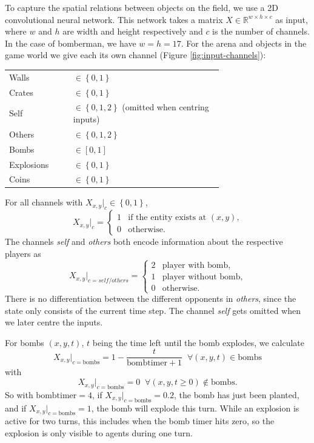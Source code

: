 

To capture the spatial relations between objects on the field, we use a 2D convolutional neural network. This network takes a matrix $X\in\mathbb{R}^{w\times h \times c} $ as input, where $w$ and $h$ are width and height respectively and $c$ is the number of channels. In the case of bomberman, we have $w=h=17$. For the arena and objects in the game world we give each its own channel (Figure \ref{fig:input-channels}):\vspace{8pt}

\begin{tabular}{l p{0.7\linewidth}}
Walls & $\in\left\{0,1\right\}$ \\
Crates & $\in\left\{0,1\right\}$ \\
Self & $\in\left\{0,1,2\right\}$ (omitted when centring inputs)\\
Others & $\in\left\{0,1,2\right\}$\\
Bombs & $\in\left[0, 1\right]$ \\
Explosions & $\in\left\{0,1\right\}$ \\
Coins& $\in\left\{0,1\right\}$ \\
\end{tabular}

\vspace{8pt}
For all channels with $X_{x, y}|_c\in\left\{0, 1\right\}$, $$X_{x, y}|_c=\begin{cases}
1 & \text{if the entity exists at $(x, y)$,} \\
0 & \text{otherwise.}
\end{cases}$$
The channels \emph{self} and \emph{others} both encode information about the respective players as
$$X_{x,y}|_{c=self/others}=\begin{cases}
2 & \text{player with bomb,} \\
1 & \text{player without bomb,} \\
0 & \text{otherwise.}
\end{cases}
$$
There is no differentiation between the different opponents in \emph{others}, since the state only consists of the current time step. The channel \emph{self} gets omitted when we later centre the inputs.

For bombs $(x, y, t)$, $t$ being the time left until the bomb explodes, we calculate $$X_{x, y}|_{c=\text{bombs}} = 1 - \frac{t}{\mathrm{bombtimer}+1} \;\;\forall (x, y, t) \in \text{bombs}$$ with $$X_{x, y}|_{c=\text{bombs}}=0 \;\;\forall (x, y, t\geq0) \notin \text{bombs}.$$
So with $\text{bombtimer}=4$, if $X_{x, y}|_{c=\text{bombs}} = 0.2$, the bomb has just been planted, and if $X_{x, y}|_{c=\text{bombs}} = 1$, the bomb will explode this turn.
While an explosion is active for two turns, this includes when the bomb timer hits zero, so the explosion is only visible to agents during one turn.




